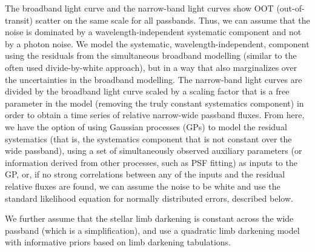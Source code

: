 \documentclass[useAMS,usenatbib]{mn2e}
\begin{document}
The broadband light curve and the narrow-band light curves show OOT (out-of-transit) scatter on the same scale for all
passbands. Thus, we can assume that the noise is dominated by a wavelength-independent systematic component and not by a
photon noise. We model the systematic, wavelength-independent, component using the residuals from the simultaneous
broadband modelling (similar to the often used divide-by-white approach), but in a way that also marginalizes over the
uncertainties in the broadband modelling. The narrow-band light curves are divided by the broadband light curve scaled
by a scaling factor that is a free parameter in the model (removing the truly constant systematics component) in order
to obtain a time series of relative narrow-wide passband fluxes. From here, we have the option of using Gaussian
processes (GPs) to model the residual systematics (that is, the systematics component that is not constant over the wide
passband), using a set of simultaneously observed auxiliary parameters (or information derived from other processes,
such as PSF fitting) as inputs to the GP, or, if no strong correlations between any of the inputs and the residual
relative fluxes are found, we can assume the noise to be white and use the standard likelihood equation for normally
distributed errors, described below.

We further assume that the stellar limb darkening is constant across the wide passband (which is a simplification), and 
use a quadratic limb darkening model with informative priors based on \citet{Claret2013} limb darkening tabulations.
\end{document}
